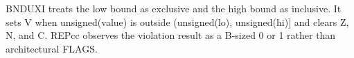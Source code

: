 BNDUXI treats the low bound as exclusive and the high bound as inclusive. It sets V when unsigned(value) is outside (unsigned(lo), unsigned(hi)] and clears Z, N, and C. REPcc observes the violation result as a B-sized 0 or 1 rather than architectural FLAGS.
